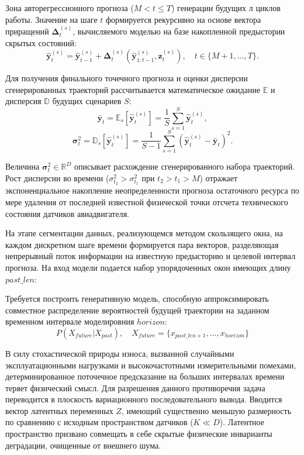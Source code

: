 \documentclass[14pt, a4paper, oneside]{extreport}
\begin{document}
Зона авторегрессионного прогноза ($M < t \le T$) генерации будущих $л$ циклов работы. Значение на шаге $t$ формируется рекурсивно на основе вектора приращений $\mathbf{\Delta}_t^{(s)}$, вычисляемого моделью на базе накопленной предыстории скрытых состояний:
\begin{equation}
\hat{\mathbf{y}}_{t}^{(s)} = \hat{\mathbf{y}}_{t-1}^{(s)} + \mathbf{\Delta}_t^{(s)}\left(\hat{\mathbf{y}}_{1:t-1}^{(s)}, \mathbf{z}_t^{(s)}\right), \quad t \in \{M+1, \dots, T\}.
\end{equation}

Для получения финального точечного прогноза и оценки дисперсии сгенерированных траекторий рассчитывается математическое ожидание $\mathbb{E}$ и дисперсия $\mathbb{D}$ будущих сценариев $S$:
\begin{equation}
\bar{\mathbf{y}}_{t} = \mathbb{E}_{s} \left[ \hat{\mathbf{y}}_{t}^{(s)} \right] = \frac{1}{S} \sum_{s=1}^{S} \hat{\mathbf{y}}_{t}^{(s)},
\end{equation}
\begin{equation}
\mathbf{\sigma}_{t}^2 = \mathbb{D}_{s} \left[ \hat{\mathbf{y}}_{t}^{(s)} \right] = \frac{1}{S-1} \sum_{s=1}^{S} \left( \hat{\mathbf{y}}_{t}^{(s)} - \bar{\mathbf{y}}_{t} \right)^2.
\end{equation}

Величина $\mathbf{\sigma}_{t}^2 \in \mathbb{R}^D$ описывает расхождение сгенерированного набора траекторий. Рост дисперсии во времени ($\sigma_{t_2}^2 > \sigma_{t_1}^2$ при $t_2 > t_1 > M$) отражает экспоненциальное накопление неопределенности прогноза остаточного ресурса по мере удаления от последней известной физической точки отсчета технического состояния датчиков авиадвигателя.

На этапе сегментации данных, реализующемся методом скользящего окна, на каждом дискретном шаге времени формируется пара векторов, разделяющая непрерывный поток информации на известную предысторию и целевой интервал прогноза. На вход модели подается набор упорядоченных окон имеющих длину $past\_len$:

Требуется построить генеративную модель, способную аппроксимировать совместное распределение вероятностей будущей траектории на заданном временном интервале моделировния $horizon$:
\begin{equation}
P(X_{future} | X_{past}), \quad X_{future} = \{x_{past\_len+1}, \dots, x_{horizon}\}
\end{equation}

В силу стохастической природы износа, вызванной случайными эксплуатационными нагрузками и высокочастотными измерительными помехами, детерминированное поточечное предсказание на больших интервалах времени теряет физический смысл. Для разрешения данного противоречия задача переводится в плоскость вариационного последовательного вывода. Вводится вектор латентных переменных $Z$, имеющий существенно меньшую размерность по сравнению с исходным пространством датчиков ($K \ll D$). Латентное пространство призвано совмещать в себе скрытые физические инварианты деградации, очищенные от внешнего шума.
\end{document}
